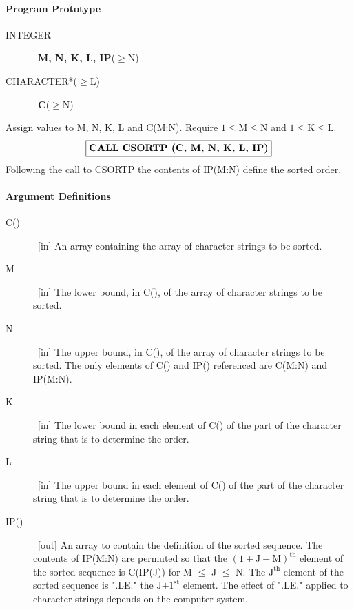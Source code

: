 \documentclass[twoside]{MATH77}
\begin{document}
\paragraph{Program Prototype}

\begin{description}
\item[INTEGER]  \ {\bf M, N, K, L, IP}($\geq $N)

\item[CHARACTER*($\geq ${\rm L})]  \ {\bf C}($\geq $N)
\end{description}

Assign values to M, N, K, L and C(M:N). Require $1 \leq
\text{M} \leq \text{N}$ and $1 \leq \text{K} \leq \text{L}.$
$$
\fbox{{\bf CALL CSORTP (C, M, N, K, L, IP)}}
$$
Following the call to CSORTP the contents of IP(M:N) define the
sorted order.

\paragraph{Argument Definitions}

\begin{description}
\item[C()]  \ [in] An array containing the array of character strings to be
sorted.

\item[M]  \ [in] The lower bound, in C(), of the array of character strings
to be sorted.

\item[N]  \ [in] The upper bound, in C(), of the array of character strings
to be sorted. The only elements of C() and IP() referenced are C(M:N)
and IP(M:N).

\item[K]  \ [in] The lower bound in each element of C() of the part of the
character string that is to determine the order.

\item[L]  \ [in] The upper bound in each element of C() of the part of the
character string that is to determine the order.

\item[IP()]  \ [out] An array to contain the definition of the sorted
sequence. The contents of IP(M:N) are permuted so that the $(1+\text{J}-
\text{M})^{\text{th}}$ element of the sorted sequence is C(IP(J)) for
M $\leq $ J $\leq $ N.  The $\text{J}^{\text{th}}$ element of the sorted
sequence is ".LE." the $\text{J+1}^{\text{st}}$ element.  The effect of
".LE." applied to character strings depends on the computer system.
\end{description}
\end{document}
